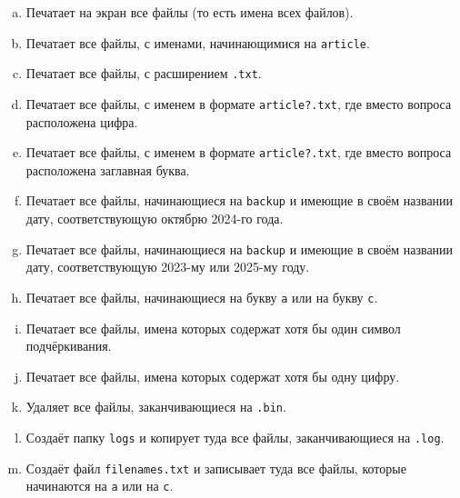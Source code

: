 \documentclass{article}
\begin{document}
\begin{enumerate}[a.]
\item Печатает на экран все файлы (то есть имена всех файлов).
\item Печатает все файлы, с именами, начинающимися на \texttt{article}.
\item Печатает все файлы, с расширением \texttt{.txt}.
\item Печатает все файлы, с именем в формате \texttt{article?.txt}, где вместо вопроса расположена цифра.
\item Печатает все файлы, с именем в формате \texttt{article?.txt}, где вместо вопроса расположена заглавная буква.
\item Печатает все файлы, начинающиеся на \texttt{backup} и имеющие в своём названии дату, соответствующую октябрю 2024-го года.
\item Печатает все файлы, начинающиеся на \texttt{backup} и имеющие в своём названии дату, соответствующую 2023-му или 2025-му году.
\item Печатает все файлы, начинающиеся на букву \texttt{a} или на букву \texttt{c}.
\item Печатает все файлы, имена которых содержат хотя бы один символ подчёркивания.
\item Печатает все файлы, имена которых содержат хотя бы одну цифру.

\item Удаляет все файлы, заканчивающиеся на \texttt{.bin}.
\item Создаёт папку \texttt{logs} и копирует туда все файлы, заканчивающиеся на \texttt{.log}.
\item Создаёт файл \texttt{filenames.txt} и записывает туда все файлы, которые начинаются на \texttt{a} или на \texttt{c}.
\end{enumerate}
\end{document}
